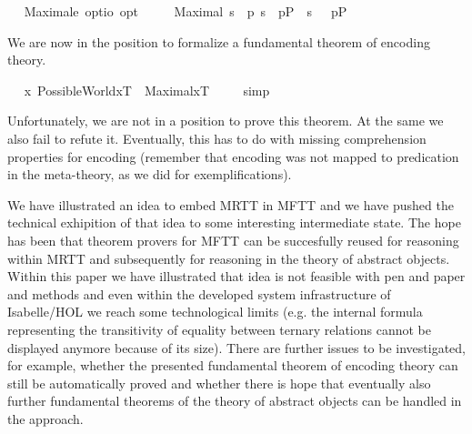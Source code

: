 \begin{isabellebody}
\ \isamarkupfalse%
\ Maximal{\isacharcolon}{\isacharcolon}{\isachardoublequoteopen}e\ opt{\isasymRightarrow}io\ opt{\isachardoublequoteclose}\ \ \isanewline
\ \ \ {\isachardoublequoteopen}Maximal\ s\ {\isasymequiv}\ {\isacharparenleft}\isactrlbold {\isasymforall}p{\isachardot}\ {\isacharparenleft}s\ {\isasymTurnstile}\ p\isactrlsup P{\isacharparenright}\ \isactrlbold {\isasymor}\ {\isacharparenleft}s\ {\isasymTurnstile}\ {\isacharparenleft}\isactrlbold {\isasymnot}\ p\isactrlsup P{\isacharparenright}{\isacharparenright}{\isacharparenright}{\isachardoublequoteclose}%
\begin{isamarkuptext}%
We are now in the position to formalize a fundamental theorem of 
 encoding theory.%
\end{isamarkuptext}%
\isamarkuptrue%
\ \isamarkupfalse%
\ {\isachardoublequoteopen}{\isacharbrackleft}{\isacharparenleft}\isactrlbold {\isasymforall}x{\isachardot}\ PossibleWorld{\isacharparenleft}x\isactrlsup T{\isacharparenright}\ \isactrlbold {\isasymrightarrow}\ Maximal{\isacharparenleft}x\isactrlsup T{\isacharparenright}{\isacharparenright}{\isacharbrackright}\ {\isacharequal}\ {\isasymtop}{\isachardoublequoteclose}%
\isadelimproof
\ %
\endisadelimproof
%
\isatagproof
{}\isamarkupfalse%
\ simp%
\endisatagproof
{\isafoldproof}%
%
\isadelimproof
%
\endisadelimproof
\ \isamarkupfalse%
\ \isamarkupfalse%
%
\isadelimproof
\ %
\endisadelimproof
%
\isatagproof
{}\isamarkupfalse%
%
\endisatagproof
{\isafoldproof}%
%
\isadelimproof
%
\endisadelimproof
%
\begin{isamarkuptext}%
Unfortunately, we are not in a position to prove this theorem. At the same we also fail
 to refute it. Eventually, this has to do with missing comprehension properties for encoding 
  (remember that encoding was not mapped to predication in the meta-theory, as we did for exemplifications).%
\end{isamarkuptext}%
\isamarkuptrue%
%
\isamarkuptrue%
%
\begin{isamarkuptext}%
We have illustrated an idea to embed MRTT in MFTT and we have pushed the technical 
  exhipition of that idea to some interesting intermediate state.
  The hope has been that theorem provers for MFTT can be succesfully reused for reasoning within
  MRTT and subsequently for reasoning in the theory of abstract objects. Within this paper we have 
  illustrated that idea is not feasible with pen and paper and methods and even within the developed
  system infrastructure of Isabelle/HOL we reach some technological limits (e.g. the internal formula
  representing the transitivity of equality between ternary relations cannot be displayed anymore 
 because of its size). There are further issues to be investigated, for example, whether the presented
 fundamental theorem of encoding theory can still be automatically proved and whether 
 there is hope that eventually also further fundamental theorems of the theory of abstract objects
 can be handled in the approach. 


\end{isamarkuptext}
\end{isabellebody}
